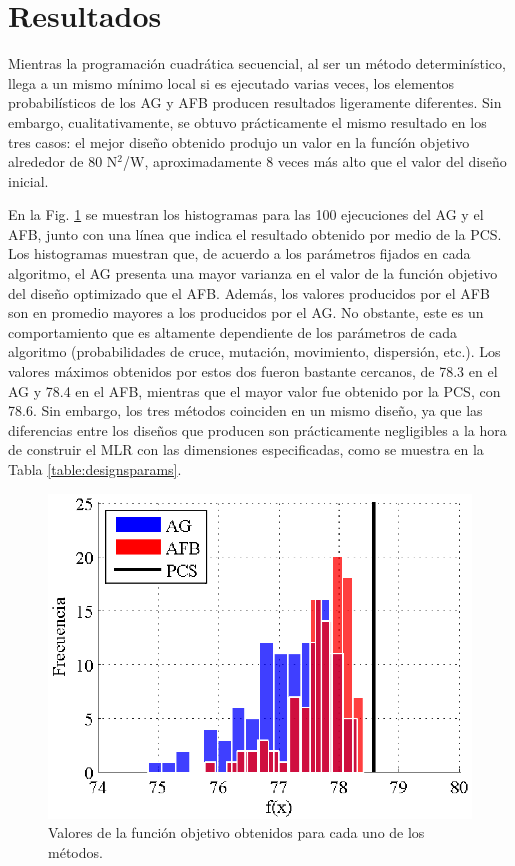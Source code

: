 \section{Resultados}
Mientras la programación cuadrática secuencial, al ser un método determinístico, llega a un mismo mínimo local si es ejecutado varias veces, los elementos probabilísticos de los AG y AFB producen resultados ligeramente diferentes. Sin embargo, cualitativamente, se obtuvo prácticamente el mismo resultado en los tres casos: el mejor diseño obtenido produjo un valor en la funcíón objetivo alrededor de 80 N$^2$/W, aproximadamente 8 veces más alto que el valor del diseño inicial. 

En la Fig. \ref{fig:resultshist} se muestran los histogramas para las 100 ejecuciones del AG y el AFB, junto con una línea que indica el resultado obtenido por medio de la PCS. Los histogramas muestran que, de acuerdo a los parámetros fijados en cada algoritmo, el AG presenta una mayor varianza en el valor de la función objetivo del diseño optimizado que el AFB. Además, los valores producidos por el AFB son en promedio mayores a los producidos por el AG. No obstante, este es un comportamiento que es altamente dependiente de los parámetros de cada algoritmo (probabilidades de cruce, mutación, movimiento, dispersión, etc.). Los valores máximos obtenidos por estos dos fueron bastante cercanos, de 78.3 en el AG y 78.4 en el AFB, mientras que el mayor valor fue obtenido por la PCS, con 78.6. Sin embargo, los tres métodos coinciden en un mismo diseño, ya que las diferencias entre los diseños que producen son prácticamente negligibles a la hora de construir el MLR con las dimensiones especificadas, como se muestra en la Tabla \ref{table:designsparams}.

\begin{figure}[t]
\centering
\includegraphics[scale=0.7]{../img/Optimizacion_del_Diseno/resultshist.eps}
\caption{Valores de la función objetivo obtenidos para cada uno de los métodos.}
\label{fig:resultshist}
\end{figure}

